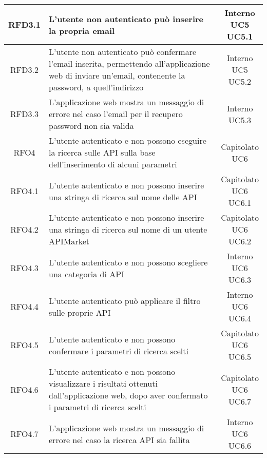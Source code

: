 \begin{longtable}{|c|m{8cm}|c|}
RFD3.1 & L'utente non autenticato può inserire la propria email & \makecell*{Interno\\UC5\\UC5.1} \\
\hline
RFD3.2 & L'utente non autenticato può confermare l'email inserita, permettendo all'applicazione web di inviare un'email, contenente la password, a quell'indirizzo & \makecell*{Interno\\UC5\\UC5.2} \\
\hline
RFD3.3 & L'applicazione web mostra un messaggio di errore nel caso l'email per il recupero password non sia valida & \makecell*{Interno\\UC5.3} \\
\hline

RFO4 & L'utente autenticato e non possono eseguire la ricerca sulle API sulla base dell'inserimento di alcuni parametri & \makecell*{Capitolato\\UC6} \\
\hline

RFO4.1 & L'utente autenticato e non possono inserire una stringa di ricerca sul nome delle API & \makecell*{Capitolato\\UC6\\UC6.1} \\
\hline
RFO4.2 & L'utente autenticato e non possono inserire una stringa di ricerca sul nome di un utente APIMarket & \makecell*{Capitolato\\UC6\\UC6.2} \\
\hline
RFO4.3 & L'utente autenticato e non possono scegliere una categoria di API & \makecell*{Interno\\UC6\\UC6.3} \\
\hline
RFO4.4 & L'utente autenticato può applicare il filtro sulle proprie API  & \makecell*{Interno\\UC6\\UC6.4} \\
\hline
RFO4.5 & L'utente autenticato e non possono confermare i parametri di ricerca scelti & \makecell*{Capitolato\\UC6\\UC6.5} \\
\hline
RFO4.6 & L'utente autenticato e non possono visualizzare i risultati ottenuti dall'applicazione web, dopo aver confermato i parametri di ricerca scelti & \makecell*{Capitolato\\UC6\\UC6.7} \\
\hline
RFO4.7 & L'applicazione web mostra un messaggio di errore nel caso la ricerca API sia fallita & \makecell*{Interno\\UC6\\UC6.6} \\
\hline


\end{longtable}
